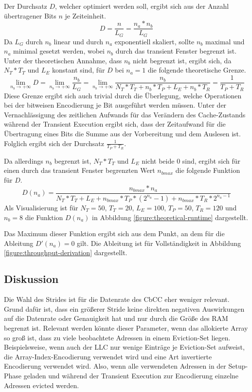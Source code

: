 Der Durchsatz $D$, welcher optimiert werden soll, ergibt sich aus
der Anzahl übertragener Bits $n$ je Zeiteinheit.
\[D=\frac{n}{L_G}=\frac{n_a*n_b}{L_G}\]
Da $L_G$ durch $n_b$ linear und durch $n_a$ exponentiell skaliert,
sollte $n_b$ maximal und $n_a$ minimal gesetzt werden, wobei $n_b$
durch das transient Fenster begrenzt ist. Unter der theoretischen
Annahme, dass $n_b$ nicht begrenzt ist, ergibt sich, da $N_T*T_T$
und $L_E$ konstant sind, für $D$ bei $n_a=1$ die folgende
theoretische Grenze.
\[\lim_{n_b\to +\infty}D=\lim_{n_b\to +\infty}\frac{n_b}{L_G}=
\lim_{n_b\to +\infty}\frac{n_b}{N_T*T_T+n_b*T_P+L_E+n_b*T_R}=
\frac{1}{T_P+T_R}\]
Diese Grenze ergibt sich auch trivial durch die Überlegung, welche
Operationen bei der bitweisen Encodierung je Bit ausgeführt werden
müssen. Unter der Vernachlässigung des zeitlichen Aufwands für das
Verändern des Cache-Zustands während der Transient Execution ergibt
sich, dass der Zeitaufwand für die Übertragung eines Bits die Summe
aus der Vorbereitung und dem Auslesen ist. Folglich ergibt sich der
Durchsatz $\frac{1}{T_P+T_R}$.

Da allerdings $n_b$ begrenzt ist, $N_T*T_T$ und $L_E$ nicht
beide $0$ sind, ergibt sich für einen durch das transient Fenster
begrenzten Wert $n_{bmax}$ die folgende Funktion für $D$.
\[D(n_a)=\frac{n_{bmax}*n_a}{N_T*T_T+L_E+n_{bmax}*T_P*(2^{n_a}-1)+n_{bmax}*T_R*2^{n_a-1}}\]
Als Visualisierung ist für $N_T=50$, $T_T=20$, $L_E=100$,
$T_P=50$, $T_R=120$ und $n_b=8$ die Funktion $D(n_a)$ in Abbildung
\ref{figure:theoretical-runtime} dargestellt.

Das Maximum dieser Funktion ergibt sich aus dem Punkt, an dem
für die Ableitung $D'(n_a)=0$ gilt. Die Ableitung ist für
Vollständigkeit in Abbildung \ref{figure:throughput-derivation}
dargestellt.

\subsection{Diskussion}
Die Wahl des Strides ist für die Datenrate des \ac{CbCC} eher
weniger relevant. Grund dafür ist, dass ein größerer Stride
keine direkten negativen Auswirkungen auf die Datenrate oder
Genauigkeit hat und nur durch die Größe des \ac{RAM} begrenzt
ist. Relevant werden könnte dieser Parameter, wenn das
allokierte Array so groß ist, dass zu viele beobachtete
Adressen in einem Eviction-Set liegen. Beispielsweise, wenn
auch der \ac{LLC} nur wenige Einträge je Eviction-Set aufweist,
die Array-Index-Encodierung verwendet wird und eine Art
invertierte Encodierung verwendet wird. Also, wenn alle verwendeten
Adressen in der Setup-Phase geladen und während der Transient
Execution zur Encodierung einzelne Adressen evicted werden.

